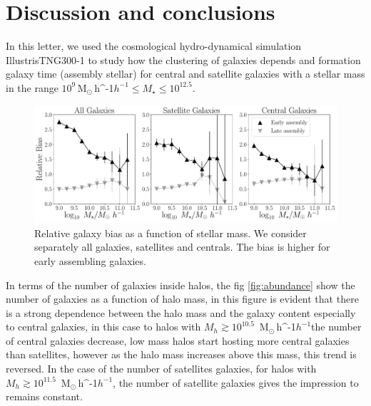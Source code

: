 \documentclass[a4paper,fleqn,usenatbib]{mnras}
\newcommand{\Msunh}{\,{\rm M}$_{\odot}$\,\ifmmode h^{-1}\else $h^{-1}$\fi}
\begin{document}
\section{Discussion and conclusions}
\label{sec:conclu}
In this letter, we used the cosmological hydro-dynamical simulation IllustrisTNG300-1 to study how the clustering of galaxies depends and formation galaxy time (assembly stellar) for central and satellite galaxies with a stellar mass in the range $10^{9}$\Msunh $\leq M_{\star} \leq 10^{12.5}$.
\begin{figure}
    \centering
    \includegraphics[width=2.0\columnwidth]{figuras/bias_galaxies.pdf}
    \caption{Relative galaxy bias as a function of stellar mass.
    We consider separately all galaxies, satellites and centrals.
    The bias is higher for early assembling galaxies.}
    \label{fig:galaxy_bias}
\end{figure}

In terms of the number of galaxies inside halos, the fig \ref{fig:abundance} show the number of galaxies as a function of halo mass, in this figure is evident that there is a strong dependence between the halo mass and the galaxy content especially to central galaxies, in this case to halos with $M_h \gtrsim 10^{10.5}$ \Msunh the number of central galaxies decrease, low mass halos start hosting more central galaxies than satellites, however as the halo mass increases above this mass, this trend is reversed. In the case of the number of satellites galaxies, for halos with $M_h\gtrsim 10^{11.5}$ \Msunh, the number of satellite galaxies gives the impression to remains constant. %
\end{document}
